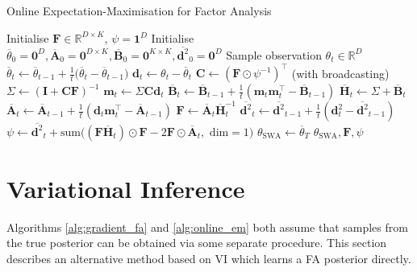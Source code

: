 \documentclass[msc,deptreport.inf]{infthesis} %
\newcommand{\matr}[1]{\mathbf{#1}}
\newcommand{\R}{\mathbb R}
\begin{document}
\begin{algorithm}[!htbp] 
	\caption{Online Expectation-Maximisation for Factor Analysis}
	\label{alg:online_em}
	\begin{algorithmic}[1]
		\State Initialise $\matr{F} \in \R^{D \times K}$, $\psi = \matr{1}^D$
		\State Initialise $\overline{\theta}_0 = \matr{0}^D, \overline{\matr{A}}_0 = \matr{0}^{D \times K}, 
			\overline{\matr{B}}_0 = \matr{0}^{K \times K}, \overline{\matr{d}^2}_0 = \matr{0}^D$
			\State Sample observation $\theta_t \in \R^D$
			\State
				$\overline{\theta}_t \leftarrow  \overline{\theta}_{t-1} + \frac{1}{t}\big(\overline{\theta}_t - \overline{\theta}_{t-1}\big)$
			\State $\matr{d}_t \leftarrow \theta_t - \overline{\theta}_t$
			\State $\matr{C} \leftarrow (\matr{F} \odot \psi^{-1})^\intercal$ (with broadcasting)
			\State $\Sigma \leftarrow (\matr{I} + \matr{C} \matr{F})^{-1}$ 
			\State $\matr{m}_t \leftarrow \Sigma \matr{C} \matr{d}_t$ 
			\State $\overline{\matr{B}}_t \leftarrow \overline{\matr{B}}_{t-1} + \frac{1}{t} (\matr{m}_t \matr{m}_t^\intercal - \overline{\matr{B}}_{t-1})$
			\State $\overline{\matr{H}}_t \leftarrow \Sigma + \overline{\matr{B}}_t$
			\State $\overline{\matr{A}}_t \leftarrow \overline{\matr{A}}_{t-1} + \frac{1}{t} (\matr{d}_t \matr{m}_t^\intercal - \overline{\matr{A}}_{t-1})$
			\State $\matr{F} \leftarrow \overline{\matr{A}}_t \overline{\matr{H}}_t^{-1}$
			\State $\overline{\matr{d}^2}_t \leftarrow \overline{\matr{d}^2}_{t-1} + \frac{1}{t} (\matr{d}_t^2 - \overline{\matr{d}^2}_{t-1})$
			\State $\psi \leftarrow 
				\overline{\matr{d}^2}_t
	+ \text{sum} \big((\matr{F} \overline{\matr{H}}_t) \odot \matr{F} -2\matr{F} \odot \overline{\matr{A}}_t , \text{ dim} = 1\big)$
		\EndFor
		\State $\theta_{\text{SWA}} \leftarrow \overline{\theta}_T$
		\State \Return $\theta_{\text{SWA}}, \matr{F}, \psi$
	\end{algorithmic}
\end{algorithm}


\section{Variational Inference}

Algorithms \ref{alg:gradient_fa} and \ref{alg:online_em} both assume that samples from the true posterior can be obtained via some separate procedure. This section describes an alternative method based on VI which learns a FA posterior directly.  
\end{document}
